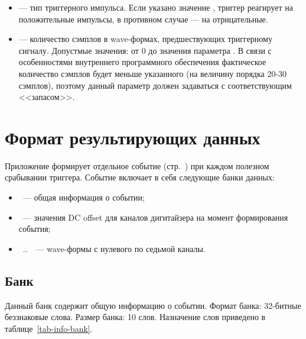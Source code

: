 \begin{itemize}
\item {} --- тип триггерного импульса. Если указано значение , триггер реагирует на положительные импульсы, в противном случае --- на отрицательные.

\item {} --- количество сэмплов в wave-формах, предшествующих триггерному сигналу. Допустмые значения: от 0 до значения параметра . В связи с особенностями внутреннего программного обеспечения \DEVICE{} \cite{CaenUM5961PostTrigger} фактическое количество сэмплов будет меньше указанного (на величину порядка 20-30 сэмплов), поэтому данный параметр должен задаваться с соответствующим <<запасом>>.

\end{itemize}

\section{Формат результирующих данных}

Приложение  формирует отдельное событие (стр.~\pageref{sec-midas-event}) при каждом полезном срабывании триггера. Событие включает в себя следующие банки данных:

\begin{itemize}

\item {}~--- общая информация о событии;
\item {}~--- значения DC offset для каналов дигитайзера на момент формирования события;
\item {}~..~~--- wave-формы с нулевого по седьмой каналы.

\end{itemize}

\subsection{Банк }
\label{sec_bank_info}

Данный банк содержит общую информацию о событии. Формат банка: 32-битные беззнаковые слова. Размер банка: 10 слов. Назначение слов приведено в таблице~\ref{tab-info-bank}.

